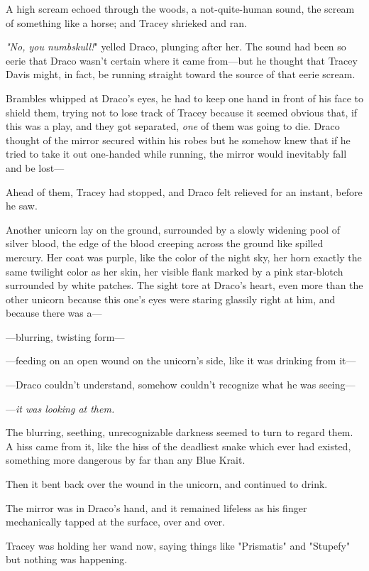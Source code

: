 A high scream echoed through the woods, a not-quite-human sound, the scream of something like a horse; and Tracey shrieked and ran.

\emph{"No, you numbskull!}" yelled Draco, plunging after her. The sound had been so eerie that Draco wasn't certain where it came from---but he thought that Tracey Davis might, in fact, be running straight toward the source of that eerie scream.

Brambles whipped at Draco's eyes, he had to keep one hand in front of his face to shield them, trying not to lose track of Tracey because it seemed obvious that, if this was a play, and they got separated, \emph{one} of them was going to die. Draco thought of the mirror secured within his robes but he somehow knew that if he tried to take it out one-handed while running, the mirror would inevitably fall and be lost---

Ahead of them, Tracey had stopped, and Draco felt relieved for an instant, before he saw.

Another unicorn lay on the ground, surrounded by a slowly widening pool of silver blood, the edge of the blood creeping across the ground like spilled mercury. Her coat was purple, like the color of the night sky, her horn exactly the same twilight color as her skin, her visible flank marked by a pink star-blotch surrounded by white patches. The sight tore at Draco's heart, even more than the other unicorn because this one's eyes were staring glassily right at him, and because there was a---

---blurring, twisting form---

---feeding on an open wound on the unicorn's side, like it was drinking from it---

---Draco couldn't understand, somehow couldn't recognize what he was seeing---

---\emph{it was looking at them.}

The blurring, seething, unrecognizable darkness seemed to turn to regard them. A hiss came from it, like the hiss of the deadliest snake which ever had existed, something more dangerous by far than any Blue Krait.

Then it bent back over the wound in the unicorn, and continued to drink.

The mirror was in Draco's hand, and it remained lifeless as his finger mechanically tapped at the surface, over and over.

Tracey was holding her wand now, saying things like "Prismatis" and "Stupefy" but nothing was happening.

